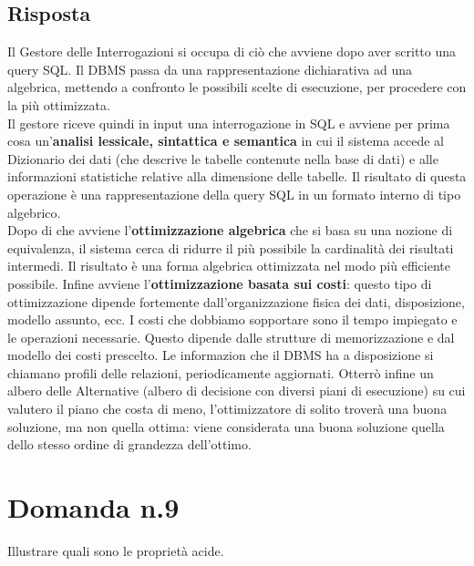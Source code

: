 \documentclass{article}
\begin{document}
\subsection*{Risposta}
Il Gestore delle Interrogazioni si occupa di ciò che avviene dopo aver scritto una query SQL. Il DBMS passa da una rappresentazione dichiarativa ad una algebrica, mettendo a confronto le possibili scelte di esecuzione, per procedere con la più ottimizzata.\\
Il gestore riceve quindi in input una interrogazione in SQL e avviene per prima cosa un'\textbf{analisi lessicale, sintattica e semantica} in cui il sistema accede al Dizionario dei dati (che descrive le tabelle contenute nella base di dati) e alle informazioni statistiche relative alla dimensione delle tabelle. Il risultato di questa operazione è una rappresentazione della query SQL
in un formato interno di tipo algebrico.\\Dopo di che avviene l'\textbf{ottimizzazione algebrica} che si basa su una nozione di equivalenza, il sistema cerca di ridurre il più possibile la cardinalità dei risultati intermedi. Il risultato è una forma algebrica ottimizzata nel modo più efficiente possibile. Infine avviene l'\textbf{ottimizzazione basata sui costi}: questo tipo di ottimizzazione dipende fortemente dall'organizzazione
fisica dei dati, disposizione, modello assunto, ecc. I costi che dobbiamo sopportare sono il tempo impiegato e le operazioni necessarie. Questo dipende dalle strutture di memorizzazione e dal modello dei costi prescelto. Le informazion che il DBMS ha a disposizione si chiamano profili delle relazioni, periodicamente aggiornati. Otterrò infine un albero delle Alternative (albero di decisione con diversi piani di esecuzione) su cui valutero il piano
che costa di meno, l'ottimizzatore di solito troverà una buona soluzione, ma non quella ottima: viene considerata una buona soluzione quella dello stesso ordine di grandezza dell'ottimo.

\section*{Domanda n.9}
Illustrare quali sono le proprietà acide.
\end{document}
